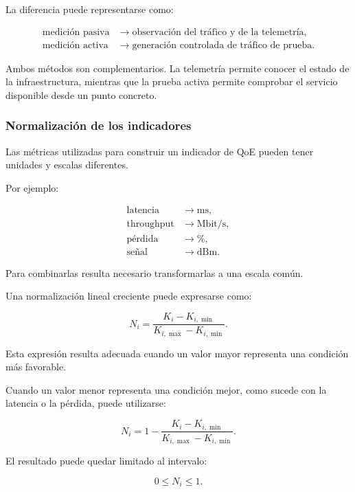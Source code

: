 La diferencia puede representarse como:

\[
\begin{aligned}
    \text{medición pasiva}
    &\longrightarrow
    \text{observación del tráfico y de la telemetría},\\
    \text{medición activa}
    &\longrightarrow
    \text{generación controlada de tráfico de prueba}.
\end{aligned}
\]

Ambos métodos son complementarios. La telemetría permite conocer el
estado de la infraestructura, mientras que la prueba activa permite
comprobar el servicio disponible desde un punto concreto.


\subsubsection*{Normalización de los indicadores}

Las métricas utilizadas para construir un indicador de QoE pueden tener
unidades y escalas diferentes.

Por ejemplo:

\[
\begin{aligned}
    \text{latencia}
    &\longrightarrow
    \mathrm{ms},\\
    \text{throughput}
    &\longrightarrow
    \mathrm{Mbit/s},\\
    \text{pérdida}
    &\longrightarrow
    \%,\\
    \text{señal}
    &\longrightarrow
    \mathrm{dBm}.
\end{aligned}
\]

Para combinarlas resulta necesario transformarlas a una escala común.

Una normalización lineal creciente puede expresarse como:

\[
    N_i
    =
    \frac{
        K_i-K_{i,\min}
    }{
        K_{i,\max}-K_{i,\min}
    }.
\]

Esta expresión resulta adecuada cuando un valor mayor representa una
condición más favorable.

Cuando un valor menor representa una condición mejor, como sucede con la
latencia o la pérdida, puede utilizarse:

\[
    N_i
    =
    1
    -
    \frac{
        K_i-K_{i,\min}
    }{
        K_{i,\max}-K_{i,\min}
    }.
\]

El resultado puede quedar limitado al intervalo:

\[
    0
    \leq
    N_i
    \leq
    1.
\]

